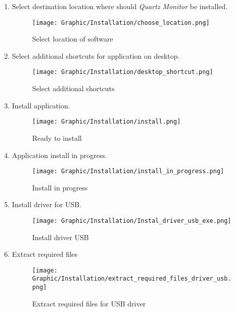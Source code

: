 \begin{enumerate}
	\item Select destination location where should \textit{Quartz Monitor} be installed. \\
	\begin{figure}[!h] 
	\centering \texttt{[image: Graphic/Installation/choose\_location.png]}	
	\caption{Select location of software}
	\label{select_location_of_software}
	\end{figure}
	\clearpage

	\item Select additional shortcuts for application on desktop. \\
	\begin{figure}[!h] 
	\centering \texttt{[image: Graphic/Installation/desktop\_shortcut.png]}	
	\caption{Select additional shortcuts}
	\label{select_additional_shortcuts}
	\end{figure}
	\FloatBarrier

	\item Install application. \\
	\begin{figure}[!h] 
	\centering \texttt{[image: Graphic/Installation/install.png]}	
	\caption{Ready to install}
	\label{redy_to_install}
	\end{figure}
   \clearpage

	\item Application install in progress. \\
	\begin{figure}[!h] 
	\centering \texttt{[image: Graphic/Installation/install\_in\_progress.png]}	
	\caption{Install in progress}
	\label{install_in_progress}
	\end{figure}
	\FloatBarrier

	\item Install driver for USB. \\
	\begin{figure}[!h] 
	\centering \texttt{[image: Graphic/Installation/Instal\_driver\_usb\_exe.png]}	
	\caption{Install driver USB}
	\label{install_in_progress}
	\end{figure}
	\FloatBarrier

	\item Extract required files \\
	\begin{figure}[!h] 
	\centering \texttt{[image: Graphic/Installation/extract\_required\_files\_driver\_usb.png]}	
	\caption{Extract required files for USB driver}
	\label{install_in_progress}
	\end{figure}
	\FloatBarrier


\end{enumerate}
